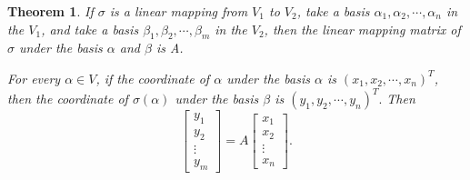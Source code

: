 \documentclass{article}
\newtheorem{theorem}{Theorem}[section]
\theoremstyle{definition}
\begin{document}
\begin{theorem}
    If $\sigma$ is a linear mapping from $V_{1}$ to $V_{2}$, 
    take a basis $\alpha_{1},\alpha_{2},\cdots,\alpha_{n}$ in the $V_{1}$, 
    and take a basis $\beta_{1},\beta_{2},\cdots,\beta_{m}$ in the $V_{2}$,
    then the linear mapping matrix of $\sigma$ under the basis $\alpha$ and $\beta$
    is A.

    For every $\alpha \in V$, if the coordinate of $\alpha$ under the basis $\alpha$
    is $(x_{1},x_{2},\cdots,x_{n})^{T}$, then the coordinate of $\sigma(\alpha)$ under the basis $\beta$
    is $(y_{1},y_{2},\cdots,y_{n})^{T}.$ Then 
    $$
    \begin{bmatrix}
        y_{1}\\
        y_{2}\\
        \vdots\\
        y_{m}
    \end{bmatrix}
    =
    A
    \begin{bmatrix}
        x_{1}\\
        x_{2}\\
        \vdots\\
        x_{n}
    \end{bmatrix}
    .$$
\end{theorem}
\end{document}
